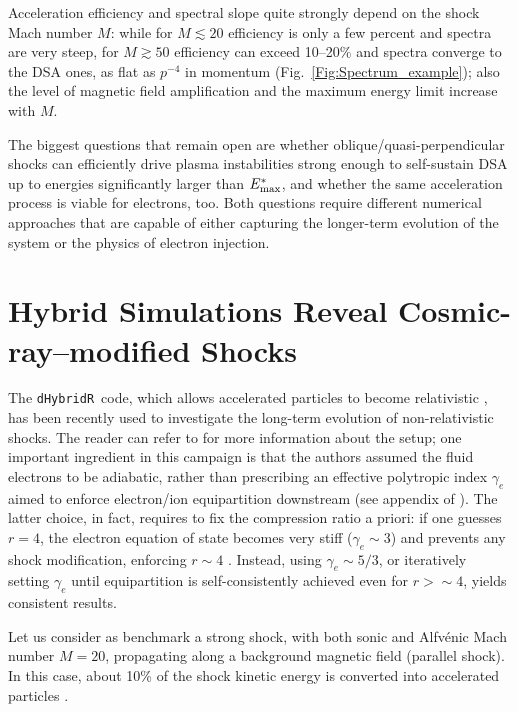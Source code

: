 \documentclass[varenna]{cimento}
\newcommand{\dHybridR}{{\tt dHybridR}}
\newcommand{\Em}{E_{\rm max}}
\begin{document}
Acceleration efficiency and spectral slope quite strongly depend on the shock Mach number $M$: while for $M\lesssim 20$ efficiency is only a few percent and spectra are very steep, for $M\gtrsim 50$ efficiency can exceed 10--20$\%$ and spectra converge to the DSA ones, as flat as $p^{-4}$ in momentum (Fig.~\ref{Fig:Spectrum_example});
also the level of magnetic field amplification and the maximum energy limit increase with $M$.

The biggest questions that remain open are whether oblique/quasi-perpendicular shocks can efficiently drive plasma instabilities strong enough to self-sustain DSA up to energies significantly larger than $\Em^*$, and whether the same acceleration process is viable for electrons, too.
Both questions require different numerical approaches that are  capable of either capturing the longer-term evolution of the system or the physics of electron injection.






\section{Hybrid Simulations Reveal Cosmic-ray--modified Shocks}\label{sec:modified}


The \dHybridR~code, which allows accelerated particles to become relativistic \cite{haggerty+19a}, has been recently used to investigate the long-term evolution of non-relativistic shocks.
The reader can refer to \cite{haggerty+20,caprioli+20} for more information about the setup; 
one important ingredient in this campaign is that the authors assumed the fluid electrons to be adiabatic, rather than prescribing an effective polytropic index $\gamma_e$ aimed to enforce electron/ion equipartition downstream (see appendix of \cite{caprioli+18}).
The latter choice, in fact, requires to fix the compression ratio a priori: if one guesses $r=4$, the electron equation of state becomes very stiff ($\gamma_e\sim 3$) and prevents any shock modification, enforcing $r\sim 4$ \cite{caprioli+14a}. 
Instead, using $\gamma_e\sim 5/3$, or iteratively setting $\gamma_e$ until equipartition is self-consistently achieved even for $r>\sim 4$, yields consistent results.

Let us consider as benchmark a strong shock, with both sonic and Alfv\'enic Mach number $M=20$, propagating along a background magnetic field (parallel shock).
In this case, about 10\% of the shock kinetic energy is converted into accelerated particles \cite{caprioli+14a}.
\end{document}
